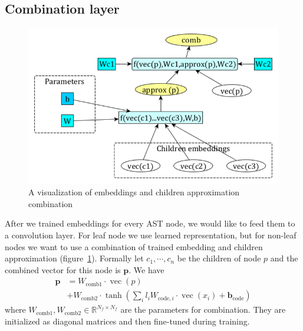 \documentclass[11pt,technote]{IEEEtran}
\DeclareMathOperator{\vect}{vec}
\begin{document}
\subsection{Combination layer}
\begin{figure}
\includegraphics[scale=0.3]{combination.png}
\caption{A visualization of embeddings and children approximation combination}
\label{combination}
\end{figure}
After we trained embeddings for every AST node, we would like to feed them to a convolution layer. For leaf
node we use learned representation, but for non-leaf nodes we want to use a combination of trained embedding
and children approximation (figure~\ref{combination}).
Formally let $c_1, \cdots, c_n$ be the children of node $p$ and the combined vector for this node
is $\bm p$. We have
\begin{align}
\nonumber
\bm p &= W_{\text{comb1}}\cdot \vect(p)\\ \nonumber
 &+ W_{\text{comb2}}\cdot
\tanh\left(\sum\nolimits_{i} l_iW_{\text{code},i}\cdot\vect(x_i)+\bm b_{\text{code}}\right)
\end{align}
where $W_{\text{comb1}}, W_{\text{comb2}}\in\mathbb{R}^{N_f\times N_f}$ are the parameters
for combination. They are initialized as diagonal matrices and then fine-tuned during training.
\end{document}
